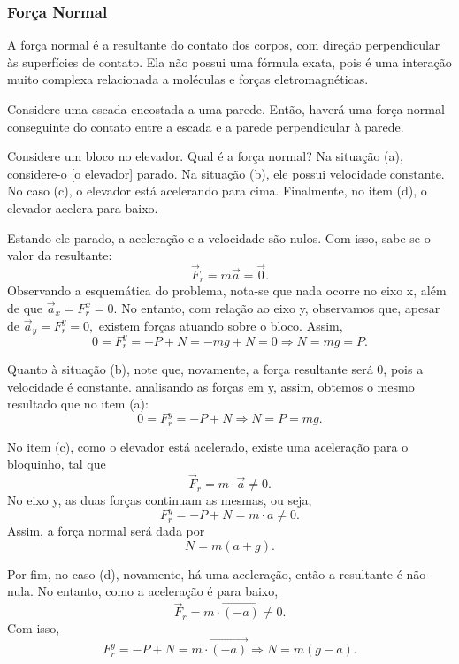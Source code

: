 \documentclass[PhysicsI/physics_notes.tex]{subfiles}
\begin{document}
\subsubsection{Força Normal}
A força normal é a resultante do contato dos corpos, com direção perpendicular às superfícies de contato. Ela não
possui uma fórmula exata, pois é uma interação muito complexa relacionada a moléculas e forças eletromagnéticas.
\begin{example}
	Considere uma escada encostada a uma parede. Então, haverá uma força normal conseguinte do contato entre a escada
	e a parede perpendicular à parede.
	\begin{center}
	\end{center}
\end{example}
\begin{example}
	Considere um bloco no elevador. Qual é a força normal? Na situação (a), considere-o [o elevador] parado. Na
	situação (b), ele possui velocidade constante. No caso (c), o elevador está acelerando para cima. Finalmente,
	no item (d), o elevador acelera para baixo.

	Estando ele parado, a aceleração e a velocidade são nulos. Com isso, sabe-se o valor da resultante:
	$$
		\vec{F}_{r} = m \vec{a} = \vec{0}.
	$$
	Observando a esquemática do problema, nota-se que nada ocorre no eixo x, além de que $\vec{a}_{x} = F_{r}^{x} = 0.$
	No entanto, com relação ao eixo y, observamos que, apesar de $\vec{a}_{y} = F_{r}^{y} = 0,$ existem forças atuando
	sobre o bloco. Assim,
	$$
		0 = F_{r}^{y} = -P + N = -mg + N = 0 \Rightarrow N = mg = P.
	$$

	Quanto à situação (b), note que, novamente, a força resultante será 0, pois a velocidade é constante.
	analisando as forças em y, assim, obtemos o mesmo resultado que no item (a):
	$$
		0 = F_{r}^{y} = -P + N \Rightarrow N = P = mg.
	$$

	No item (c), como o elevador está acelerado, existe uma aceleração para o bloquinho, tal que
	$$
		\vec{F}_{r} = m \cdot \vec{a} \neq 0.
	$$
	No eixo y, as duas forças continuam as mesmas, ou seja,
	$$
		F_{r}^{y} = -P + N = m \cdot a\neq 0.
	$$
	Assim, a força normal será dada por
	$$
		N = m(a + g).
	$$

	Por fim, no caso (d), novamente, há uma aceleração, então a resultante é não-nula. No entanto, como a aceleração é para baixo,
	$$
		\vec{F}_{r} = m \cdot \vec{(-a)}\neq 0.
	$$
	Com isso,
	$$
		F_{r}^{y} = -P + N = m \cdot \vec{(-a)} \Rightarrow N = m(g - a).
	$$
\end{example}
\end{document}
